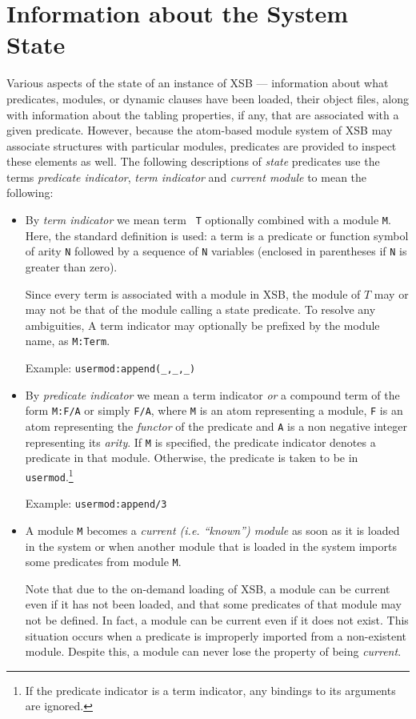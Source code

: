 \section{Information about the System State} \label{State}
 

Various aspects of the state of an instance of XSB --- information
about what predicates, modules, or dynamic clauses have been loaded,
their object files, along with information about the tabling
properties, if any, that are associated with a given predicate.
However, because the atom-based module system of XSB may associate
structures with particular modules, predicates are provided to inspect
these elements as well.  The following descriptions of {\em state}
predicates use the terms {\em predicate indicator}, {\em term
  indicator} and {\em current module} to mean the following:
 
\begin{itemize}
\item By {\em term indicator}  we mean term {\tt
  T} optionally combined with a module {\tt M}.  Here, the standard
  definition is used: a term is a predicate or function symbol of
  arity {\tt N} followed by a sequence of {\tt N} variables (enclosed
  in parentheses if {\tt N} is greater than zero).

  Since every term is associated with a module in XSB, the module of
  $T$ may or may not be that of the module calling a state predicate.
  To resolve any ambiguities, A term indicator may optionally be
  prefixed by the module name, as {\tt M:Term}.

  Example: {\tt usermod:append(\_,\_,\_)}
\item By {\em predicate indicator}  we mean
  a term indicator {\em or} a compound term of the form {\tt M:F/A} or
  simply {\tt F/A}, where {\tt M} is an atom representing a module,
  {\tt F} is an atom representing the {\em functor} of the predicate
  and {\tt A} is a non negative integer representing its {\em arity}.
  If {\tt M} is specified, the predicate indicator denotes a predicate
  in that module.  Otherwise, the predicate is taken to be in {\tt
    usermod}.\footnote{If the predicate indicator is a term indicator,
    any bindings to its arguments are ignored.}

      Example: {\tt usermod:append/3}
\item A module {\tt M} becomes a {\em current (i.e. ``known'') module} as
      soon as it is loaded in the system or when another module that is
      loaded in the system imports some predicates from module {\tt M}.

      Note that due to the on-demand loading of XSB, a module can be
      current even if it has not been loaded, and that some predicates
      of that module may not be defined. In fact, a module can be
      current even if it does not exist.  This situation occurs when a
      predicate is improperly imported from a non-existent module.
      Despite this, a module can never lose the property of being {\em
        current}.
\end{itemize}
